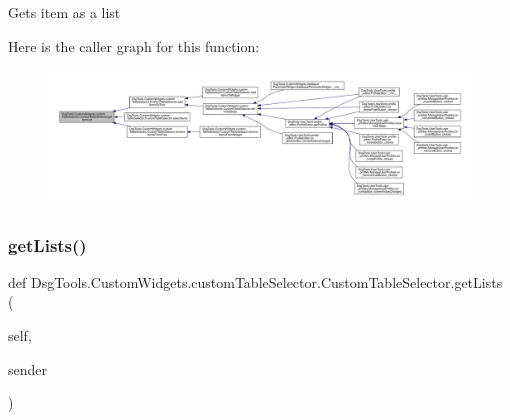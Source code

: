 \begin{DoxyVerb}Gets item as a list
\end{DoxyVerb}
 Here is the caller graph for this function\+:
\nopagebreak
\begin{figure}[H]
\begin{center}
\leavevmode
\includegraphics[width=350pt]{class_dsg_tools_1_1_custom_widgets_1_1custom_table_selector_1_1_custom_table_selector_a97292df493f03e0002c37aa4137955ae_icgraph}
\end{center}
\end{figure}
\mbox{\label{class_dsg_tools_1_1_custom_widgets_1_1custom_table_selector_1_1_custom_table_selector_a1bd2f667614af00a55c8f4c00d4934a3}} 
\subsubsection{\texorpdfstring{get\+Lists()}{getLists()}}
{\footnotesize\ttfamily def Dsg\+Tools.\+Custom\+Widgets.\+custom\+Table\+Selector.\+Custom\+Table\+Selector.\+get\+Lists (\begin{DoxyParamCaption}\item[{}]{self,  }\item[{}]{sender }\end{DoxyParamCaption})}


